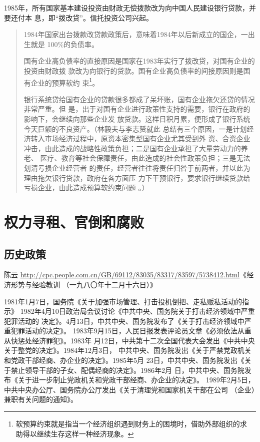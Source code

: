 1985年，所有国家基本建设投资由财政无偿拨款改为向中国人民建设银行贷款，并要还付本
息，即“拨改贷”。信托投资公司兴起。
\begin{quotation}
  1984年国家出台拨款改贷款政策后，意味着1984年以后新成立的国企，一出生就是
  100\%的负债率。\cite{bogaidaizhaizhuangu}

  国有企业高负债率的直接原因是国家在1983年实行了拨改贷，对国有企业的投资由财政拨
  款改为向银行的贷款。国有企业高负债率的间接原因则是国有企业的预算软约
  束\footnote{软预算约束就是指当一个经济组织遇到财务上的困境时，借助外部组织的求
    助得以继续生存这样一种经济现象。}。\cite{linyifuzhai}

  银行系统贷给国有企业的贷款很多都成了呆坏账，国有企业拖欠还贷的情况非常严重。但
  是，出于对国有企业进行政策性支持的需要，银行在政府的影响下，会继续向那些企业发
  放贷款。这样日积月累，便形成了银行系统今天巨额的不良资产。（林毅夫与李志赟就此
  总结有三个原因，一是计划经济转入市场经济过程中，原资本密集型国有企业尤其受到外
  资、合资企业冲击，由此造成的战略性政策负担；二是国有企业承担了大量劳动力的养老、
  医疗、教育等社会保障责任，由此造成的社会性政策负担；三是无法划清亏损企业经营者
  的责任，经营者往往将责任归咎于前两者，并以此为理由拖欠银行贷款，政府在各方面压
  力下干预银行，要求银行继续贷款给亏损企业，由此造成预算软约束问题
  。）\cite{guoyoujinrong}
\end{quotation}



\section{权力寻租、官倒和腐败}

\subsection{历史政策}
陈云 \url{http://cpc.people.com.cn/GB/69112/83035/83317/83597/5738412.html}《经济形势与经验教训 （一九八〇年十二月十六日）》

1981年1月7日，国务院《关于加强市场管理、打击投机倒把、走私贩私活动的指示》
1982年4月10日政治局会议讨论《中共中央、国务院关于打击经济领域中严重犯罪活动的
决定》。4月13日，中共中央、国务院发布了《关于打击经济领域中严重犯罪活动的决定》。
1983年9月15日，人民日报发表评论员文章《必须依法从重从快惩处经济罪犯》。1983年
月12日，中共第十二次全国代表大会发出《中共中央关于整党的决定》。1984年12月3日，
中共中央、国务院发出《关于严禁党政机关和党政干部经商、办企业的决定》。1985年5月
23日，中共中央、国务院发出《关于禁止领导干部的子女、配偶经商的决定》。1986年2月
日，中共中央、国务院发布《关于进一步制止党政机关和党政干部经商、办企业的决定》。
1989年2月5日，中共中央办公厅、国务院办公厅发出《关于清理党和国家机关干部在公司
（企业）兼职有关问题的通知》。

